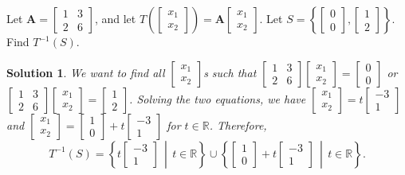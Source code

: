 \documentclass[]{book}
\newcommand{\inv}[1]{\ensuremath{{#1}^{-1}}}
\newcommand{\vecxx}[1][x]{\ensuremath{\begin{bmatrix}
#1_1 \\
#1_2
\end{bmatrix}}}
\newcommand{\suchthat}{\,\middle|\,}
\newcommand{\mat}[1]{\ensuremath{\mathbf{#1}}}
\newcommand{\R}{\ensuremath{\mathbb{R}}}
\newtheorem*{solution}{Solution}
\begin{document}
\begin{example}
    \label{expl:find preimage}
    Let $\mat{A} = \begin{bmatrix}1 & 3 \\ 2 & 6 \end{bmatrix}$, and let $T\left(\vecxx\right)=\mat{A}\vecxx$. Let $S=\left\{\begin{bmatrix}0 \\ 0\end{bmatrix}, \begin{bmatrix}1 \\ 2\end{bmatrix}\right\}$. Find $\inv{T}(S)$.
\begin{solution}
    We want to find all $\vecxx$s such that $\begin{bmatrix}1 & 3 \\ 2 & 6 \end{bmatrix}\vecxx = \begin{bmatrix}0 \\ 0\end{bmatrix}$ or $\begin{bmatrix}1 & 3 \\ 2 & 6 \end{bmatrix}\vecxx = \begin{bmatrix}1 \\ 2\end{bmatrix}$. Solving the two equations, we have $\vecxx = t\begin{bmatrix}-3 \\ 1\end{bmatrix}$ and $\vecxx = \begin{bmatrix}1 \\ 0\end{bmatrix} + t\begin{bmatrix}-3 \\ 1\end{bmatrix}$ for $t \in \R$. Therefore, \[\inv{T}(S) = \left\{t\begin{bmatrix}-3 \\ 1\end{bmatrix} \suchthat t \in \R\right\} \cup \left\{\begin{bmatrix}1 \\ 0\end{bmatrix} + t\begin{bmatrix}-3 \\ 1\end{bmatrix} \suchthat t \in \R\right\}.\]
    \hfill \qedsymbol
\end{solution}
\end{example}
\end{document}
